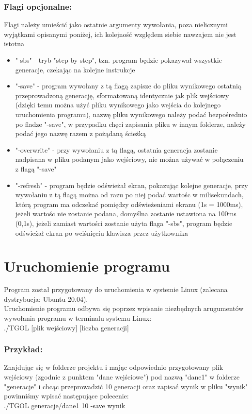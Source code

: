 \documentclass[11pt,a4paper]{report}
\begin{document}
\subsubsection {Flagi opcjonalne:}
Flagi należy umieścić jako ostatnie argumenty wywołania, poza nielicznymi wyjątkami opisanymi poniżej, ich kolejność względem siebie nawzajem nie jest istotna
\begin {itemize}
\item "-sbs" - tryb "step by step", tzn. program będzie pokazywał wszystkie generacje, czekając na kolejne instrukcje
\item "-save" - program wywołany z tą flagą zapisze do pliku wynikowego ostatnią przeprowadzoną generację, sformatowaną identycznie jak plik wejściowy (dzięki temu można użyć pliku wynikowego jako wejścia do kolejnego uruchomienia programu), nazwę pliku wynikowego należy podać bezpośrednio po fladze "-save", w przypadku chęci zapisania pliku w innym folderze, należy podać jego nazwę razem z pożądaną ścieżką
\item "-overwrite" - przy wywołaniu z tą flagą, ostatnia generacja zostanie nadpisana w pliku podanym jako wejściowy, nie można używać w połączeniu z flagą "-save"
\item "-refresh" - program będzie odświeżał ekran, pokazując kolejne generacje, przy wywołaniu z tą flagą można od razu po niej podać wartośc w milisekundach, którą program ma odczekać pomiędzy odświeżeniami ekranu (1s = 1000ms), jeżeli wartośc nie zostanie podana, domyślna zostanie ustawiona na 100ms (0,1s), jeżeli zamiast wartości zostanie użyta flaga "-sbs", program będzie odświeżał ekran po wciśnięciu klawisza przez użytkownika
\end {itemize}

\section{Uruchomienie programu}\label{sec:teskt}
Program został przygotowany do uruchomienia w systemie Linux (zalecana dystrybucja: Ubuntu 20.04).\\
Uruchomienie programu odbywa się poprzez wpisanie niezbędnych arugumentów wywołania programu w terminalu systemu Linux:\\
./TGOL [plik wejściowy] [liczba generacji]
\subsubsection{Przykład:}
Znajdując się w folderze projektu i mając odpowiednio przygotowany plik wejściowy (zgodnie z punktem "dane wejściowe") pod nazwą "dane1" w folderze "generacje" i chcąc przeprowadzić 10 generacji oraz zapisać wynik w pliku "wynik" powinniśmy wpisać następujące polecenie:\\
./TGOL generacje/dane1 10 -save wynik
\end{document}
